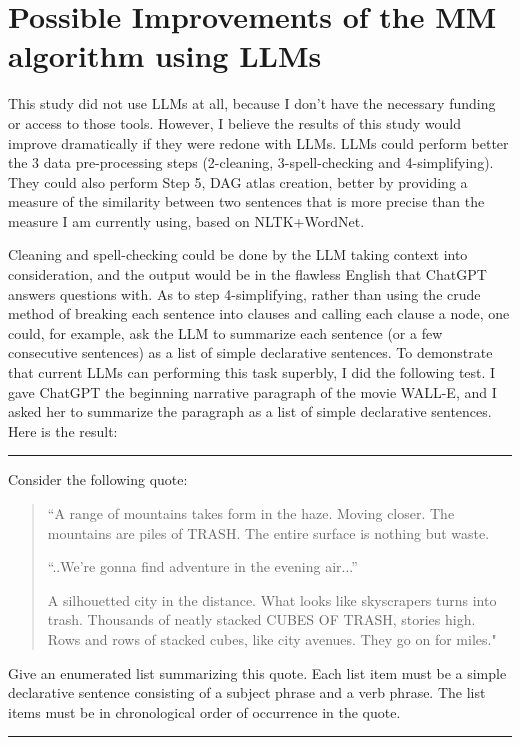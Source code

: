 \documentclass[12pt]{article}
\begin{document}
\section{Possible Improvements
of the MM algorithm
using LLMs}

This study did not use LLMs at all,
because I don't have the necessary
funding or
access to those tools.
However,
I believe the results
of this study would improve
dramatically if they were redone with LLMs.
LLMs could perform better
the 3 data pre-processing steps
(2-cleaning, 3-spell-checking and 4-simplifying).
They  could also perform Step 5, DAG atlas creation,
better by providing a  
measure of the similarity 
between two sentences that is more
precise than the 
measure I am currently using, based on NLTK+WordNet.


Cleaning and spell-checking
could be done by the LLM
taking context into consideration,
and the output would be in the 
flawless English that ChatGPT
answers questions with.
As to step 4-simplifying,
rather than using the crude method
of breaking each sentence into clauses
and calling each clause a node,
one could, for example,
ask the LLM to summarize each sentence (or a few 
consecutive sentences) as a list of simple
declarative sentences.
To demonstrate that current LLMs can 
performing this task superbly, I
did the following test. I gave ChatGPT the
beginning narrative paragraph of the movie 
WALL-E, and I asked her to summarize the
paragraph as a list of simple declarative sentences.
Here is the result:
\\
\hrule
{} 

Consider the following quote:
\begin{quote}
``A range of mountains takes form in the haze.
Moving closer.
The mountains are piles of TRASH.
The entire surface is nothing but waste.

``..We're gonna find adventure in the evening air...''

A silhouetted city in the distance.
What looks like skyscrapers turns into trash.
Thousands of neatly stacked CUBES OF TRASH, stories high.
Rows and rows of stacked cubes, like city avenues.
They go on for miles."
\end{quote}

Give an enumerated list summarizing this quote.
Each list item must be a simple declarative sentence
consisting of a subject phrase and a verb phrase.
The list items must be in chronological order of occurrence
in the quote.
\\
\hrule
{}
\end{document}
